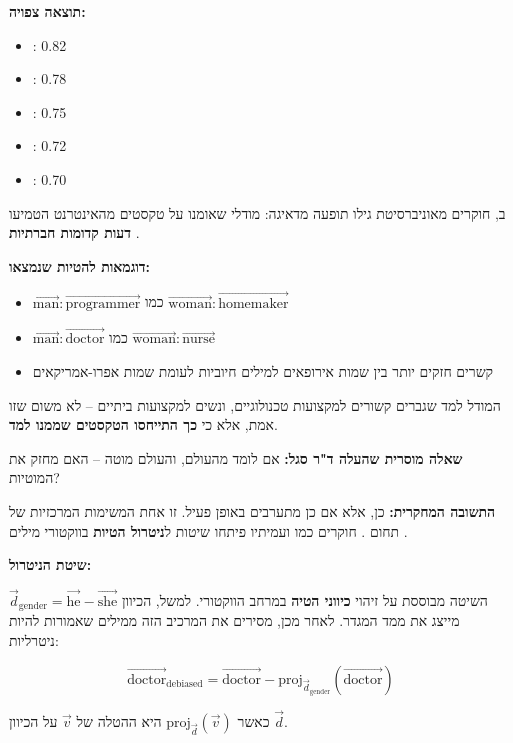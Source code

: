 \textbf{תוצאה צפויה:}
\begin{itemize}
\item {}: \num{0.82}
\item {}: \num{0.78}
\item {}: \num{0.75}
\item {}: \num{0.72}
\item {}: \num{0.70}
\end{itemize}


ב\en{-}, חוקרים מאוניברסיטת  גילו תופעה מדאיגה: מודלי  שאומנו על טקסטים מהאינטרנט הטמיעו \textbf{דעות קדומות חברתיות} \cite{caliskan2017}.

\textbf{דוגמאות להטיות שנמצאו:}

\begin{itemize}
\item $\vec{\text{man}} : \vec{\text{programmer}}$ כמו $\vec{\text{woman}} : \vec{\text{homemaker}}$
\item $\vec{\text{man}} : \vec{\text{doctor}}$ כמו $\vec{\text{woman}} : \vec{\text{nurse}}$
\item קשרים חזקים יותר בין שמות אירופאים למילים חיוביות לעומת שמות אפרו-אמריקאים
\end{itemize}

המודל למד שגברים קשורים למקצועות טכנולוגיים, ונשים למקצועות ביתיים – לא משום שזו אמת, אלא כי \textbf{כך התייחסו הטקסטים שממנו למד}.

\textbf{שאלה מוסרית שהעלה ד"ר סגל:} אם  לומד מהעולם, והעולם מוטה – האם  מחזק את המוטיות?

\textbf{התשובה המחקרית:} כן, אלא אם כן מתערבים באופן פעיל. זו אחת המשימות המרכזיות של תחום \textbf{}. חוקרים כמו  ועמיתיו פיתחו שיטות ל\textbf{ניטרול הטיות}  בווקטורי מילים \cite{bolukbasi2016}.

\textbf{שיטת הניטרול:}

השיטה מבוססת על זיהוי \textbf{כיווני הטיה} במרחב הווקטורי. למשל, הכיוון $\vec{d}_{\text{gender}} = \vec{\text{he}} - \vec{\text{she}}$ מייצג את ממד המגדר. לאחר מכן, מסירים את המרכיב הזה ממילים שאמורות להיות ניטרליות:

\[
\vec{\text{doctor}}_{\text{debiased}} = \vec{\text{doctor}} - \text{proj}_{\vec{d}_{\text{gender}}}(\vec{\text{doctor}})
\]

כאשר $\text{proj}_{\vec{d}}(\vec{v})$ היא ההטלה של $\vec{v}$ על הכיוון $\vec{d}$.

